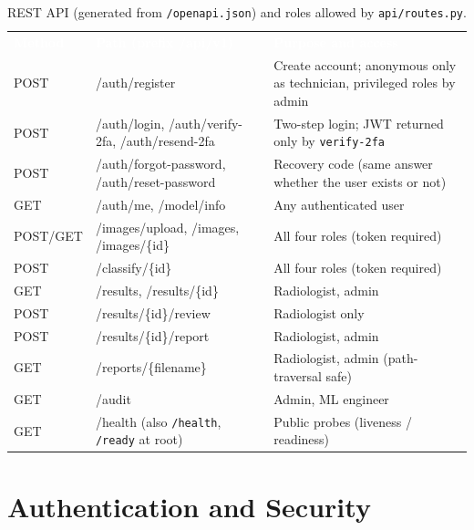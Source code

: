\documentclass[12pt,a4paper]{article}
\newcommand{\hd}[1]{\textcolor{white}{\textbf{#1}}}
\begin{document}
\begin{table}[H]
\centering
\caption{REST API (generated from \texttt{/openapi.json}) and roles allowed by \texttt{api/routes.py}.}
\label{tab:endpoints}
\renewcommand{\arraystretch}{1.15}
\footnotesize
\begin{tabularx}{\textwidth}{L{1.5cm} L{5.4cm} Y}
\hd{Method} & \hd{Path (prefix /api/v1)} & \hd{Purpose and access} \\
POST & /auth/register & Create account; anonymous only as technician, privileged roles by admin \\
POST & /auth/login, /auth/verify-2fa, /auth/resend-2fa & Two-step login; JWT returned only by \texttt{verify-2fa} \\
POST & /auth/forgot-password, /auth/reset-password & Recovery code (same answer whether the user exists or not) \\
GET & /auth/me, /model/info & Any authenticated user \\
POST/GET & /images/upload, /images, /images/\{id\} & All four roles (token required) \\
POST & /classify/\{id\} & All four roles (token required) \\
GET & /results, /results/\{id\} & Radiologist, admin \\
POST & /results/\{id\}/review & Radiologist only \\
POST & /results/\{id\}/report & Radiologist, admin \\
GET & /reports/\{filename\} & Radiologist, admin (path-traversal safe) \\
GET & /audit & Admin, ML engineer \\
GET & /health (also \texttt{/health}, \texttt{/ready} at root) & Public probes (liveness / readiness) \\
\end{tabularx}
\end{table}

\section{Authentication and Security}
\label{sec:auth}
\end{document}
